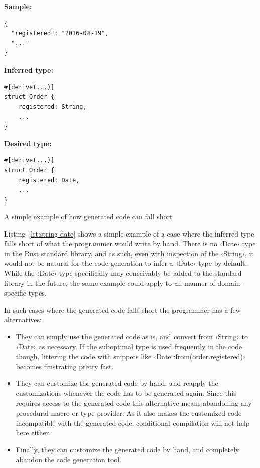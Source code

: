 \begin{listing}[ht!]
\textbf{Sample:}
\begin{verbatim}
{
  "registered": "2016-08-19",
  "..."
}
\end{verbatim}
\vspace{5mm}

\textbf{Inferred type:}
\begin{verbatim}
#[derive(...)]
struct Order {
    registered: String,
    ...
}
\end{verbatim}
\vspace{5mm}

\textbf{Desired type:}
\begin{verbatim}
#[derive(...)]
struct Order {
    registered: Date,
    ...
}
\end{verbatim}
\caption{A simple example of how generated code can fall short}
\label{lst:string-date}
\end{listing}

Listing~\ref{lst:string-date} shows a simple example of a case where the inferred type falls short of what the programmer would write by hand. There is no ‹Date› type in the Rust standard library, and as such, even with inspection of the ‹String›, it would not be natural for the code generation to infer a ‹Date› type by default. While the ‹Date› type specifically may conceivably be added to the standard library in the future, the same example could apply to all manner of domain-specific types.

In such cases where the generated code falls short the programmer has a few alternatives:

\begin{itemize}
  \item They can simply use the generated code as is, and convert from ‹String› to ‹Date› as necessary. If the suboptimal type is used frequently in the code though, littering the code with snippets like ‹Date::from(order.registered)› becomes frustrating pretty fast.
  \item They can customize the generated code by hand, and reapply the customizations whenever the code has to be generated again. Since this requires access to the generated code this alternative means abandoning any procedural macro or type provider. As it also makes the customized code incompatible with the generated code, conditional compilation will not help here either.
  \item Finally, they can customize the generated code by hand, and completely abandon the code generation tool.
\end{itemize}

